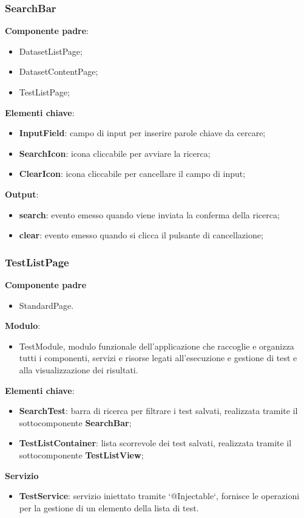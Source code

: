 \subsubsection{SearchBar}
\textbf{Componente padre}:
\begin{itemize}
    \item DatasetListPage;
    \item DatasetContentPage;
    \item TestListPage;
\end{itemize}
\textbf{Elementi chiave}:
\begin{itemize}
    \item \textbf{InputField}: campo di input per inserire parole chiave da cercare;
    \item \textbf{SearchIcon}: icona cliccabile per avviare la ricerca;
    \item \textbf{ClearIcon}: icona cliccabile per cancellare il campo di input;
\end{itemize}
\textbf{Output}:
\begin{itemize}
    \item \textbf{search}: evento emesso quando viene inviata la conferma della ricerca;
    \item \textbf{clear}: evento emesso quando si clicca il pulsante di cancellazione;
\end{itemize} 
\subsubsection{TestListPage}
\textbf{Componente padre}
\begin{itemize}
    \item StandardPage.
\end{itemize}
\textbf{Modulo}:
\begin{itemize}
    \item TestModule, modulo funzionale dell'applicazione che raccoglie e organizza tutti i componenti, servizi e risorse legati all'esecuzione e gestione di test e alla visualizzazione dei risultati.    
\end{itemize}
\textbf{Elementi chiave}:
\begin{itemize}
    \item \textbf{SearchTest}: barra di ricerca per filtrare i test salvati, realizzata tramite il sottocomponente \textbf{SearchBar};
    \item \textbf{TestListContainer}: lista scorrevole dei test salvati, realizzata tramite il sottocomponente \textbf{TestListView};
\end{itemize}
\textbf{Servizio}
\begin{itemize}
    \item \textbf{TestService}: servizio iniettato tramite `@Injectable`, fornisce le operazioni per la gestione di un elemento della lista di test.
\end{itemize}
